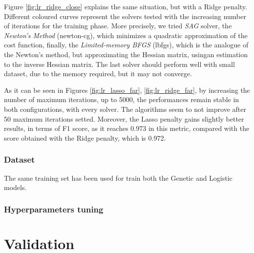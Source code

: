 Figure \ref{fig:lr_ridge_close} explains the same situation, but with a Ridge penalty. Different coloured curves represent the solvers tested with the increasing number of iterations for the training phase. More precisely, we tried \textit{SAG} solver, the \textit{Newton's Method} (newton-cg), which minimizes a quadratic approximation of the cost function, finally, the  \textit{Limited-memory BFGS} (lbfgs), which is the analogue of the Newton's method, but approximating the Hessian matrix, usingan estimation to the inverse Hessian matrix. The last solver should perform well with small dataset, due to the memory required, but it may not converge.

As it can be seen in Figures \ref{fig:lr_lasso_far}, \ref{fig:lr_ridge_far}, by increasing the number of maximum iterations, up to 5000, the performances remain stable in both configurations, with every solver.
The algorithms seem to not improve after 50 maximum iterations setted.
Moreover, the Lasso penalty gains slightly better results, in terms of F1 score, as it reaches 0.973 in this metric, compared with the score obtained with the Ridge penalty, which is 0.972.



\subsubsection{Dataset}
The same training set has been used for train both the Genetic and Logistic models.
\subsubsection{Hyperparameters tuning}
\section{Validation}